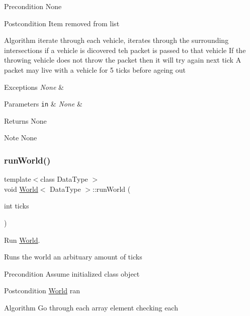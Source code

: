 \begin{DoxyPrecond}{Precondition}
None
\end{DoxyPrecond}
\begin{DoxyPostcond}{Postcondition}
Item removed from list
\end{DoxyPostcond}
\begin{DoxyParagraph}{Algorithm}
iterate through each vehicle, iterates through the surrounding intersections if a vehicle is dicovered teh packet is passed to that vehicle If the throwing vehicle does not throw the packet then it will try again next tick A packet may live with a vehicle for 5 ticks before ageing out
\end{DoxyParagraph}

\begin{DoxyExceptions}{Exceptions}
{\em None} & \\
\hline
\end{DoxyExceptions}

\begin{DoxyParams}[1]{Parameters}
\mbox{\tt in}  & {\em None} & \\
\hline
\end{DoxyParams}
\begin{DoxyReturn}{Returns}
None
\end{DoxyReturn}
\begin{DoxyNote}{Note}
None 
\end{DoxyNote}
\hypertarget{class_world_a9cdd2368878d4fed45c60a621b2ff0c0}{}\label{class_world_a9cdd2368878d4fed45c60a621b2ff0c0} 
\subsubsection{\texorpdfstring{run\+World()}{runWorld()}}
{\footnotesize\ttfamily template$<$class Data\+Type $>$ \\
void \hyperlink{class_world}{World}$<$ Data\+Type $>$\+::run\+World (\begin{DoxyParamCaption}\item[{int}]{ticks }\end{DoxyParamCaption})}



Run \hyperlink{class_world}{World}. 

Runs the world an arbituary amount of ticks

\begin{DoxyPrecond}{Precondition}
Assume initialized class object
\end{DoxyPrecond}
\begin{DoxyPostcond}{Postcondition}
\hyperlink{class_world}{World} ran
\end{DoxyPostcond}
\begin{DoxyParagraph}{Algorithm}
Go through each array element checking each
\end{DoxyParagraph}

